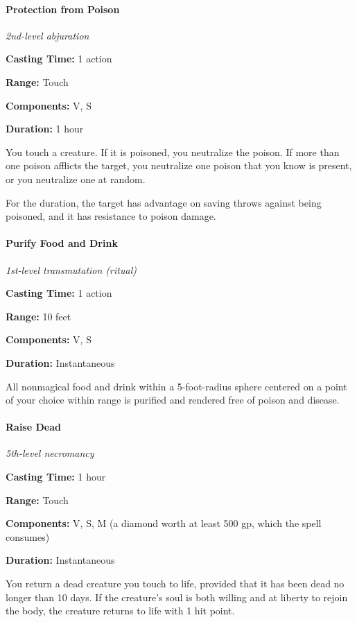 \documentclass[
]{article}
\begin{document}
\hypertarget{protection-from-poison}{%
\paragraph{Protection from Poison}\label{protection-from-poison}}

\emph{2nd-level abjuration}

\textbf{Casting Time:} 1 action

\textbf{Range:} Touch

\textbf{Components:} V, S

\textbf{Duration:} 1 hour

You touch a creature. If it is poisoned, you neutralize the poison. If
more than one poison afflicts the target, you neutralize one poison that
you know is present, or you neutralize one at random.

For the duration, the target has advantage on saving throws against
being poisoned, and it has resistance to poison damage.

\hypertarget{purify-food-and-drink}{%
\paragraph{Purify Food and Drink}\label{purify-food-and-drink}}

\emph{1st-level transmutation (ritual)}

\textbf{Casting Time:} 1 action

\textbf{Range:} 10 feet

\textbf{Components:} V, S

\textbf{Duration:} Instantaneous

All nonmagical food and drink within a 5-foot-radius sphere centered on
a point of your choice within range is purified and rendered free of
poison and disease.

\hypertarget{raise-dead}{%
\paragraph{Raise Dead}\label{raise-dead}}

\emph{5th-level necromancy}

\textbf{Casting Time:} 1 hour

\textbf{Range:} Touch

\textbf{Components:} V, S, M (a diamond worth at least 500 gp, which the
spell consumes)

\textbf{Duration:} Instantaneous

You return a dead creature you touch to life, provided that it has been
dead no longer than 10 days. If the creature's soul is both willing and
at liberty to rejoin the body, the creature returns to life with 1 hit
point.
\end{document}
